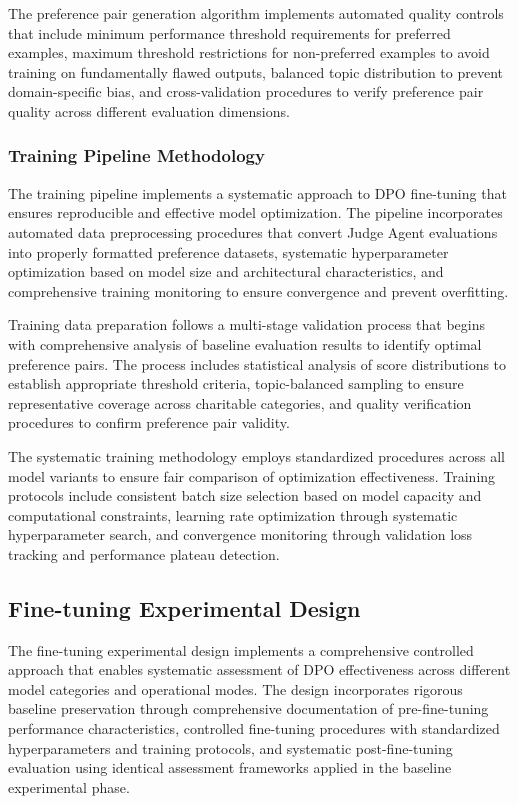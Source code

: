 The preference pair generation algorithm implements automated quality controls that include minimum performance threshold requirements for preferred examples, maximum threshold restrictions for non-preferred examples to avoid training on fundamentally flawed outputs, balanced topic distribution to prevent domain-specific bias, and cross-validation procedures to verify preference pair quality across different evaluation dimensions.

\subsubsection{Training Pipeline Methodology}

The training pipeline implements a systematic approach to DPO fine-tuning that ensures reproducible and effective model optimization. The pipeline incorporates automated data preprocessing procedures that convert Judge Agent evaluations into properly formatted preference datasets, systematic hyperparameter optimization based on model size and architectural characteristics, and comprehensive training monitoring to ensure convergence and prevent overfitting.

Training data preparation follows a multi-stage validation process that begins with comprehensive analysis of baseline evaluation results to identify optimal preference pairs. The process includes statistical analysis of score distributions to establish appropriate threshold criteria, topic-balanced sampling to ensure representative coverage across charitable categories, and quality verification procedures to confirm preference pair validity.

The systematic training methodology employs standardized procedures across all model variants to ensure fair comparison of optimization effectiveness. Training protocols include consistent batch size selection based on model capacity and computational constraints, learning rate optimization through systematic hyperparameter search, and convergence monitoring through validation loss tracking and performance plateau detection.

\subsection{Fine-tuning Experimental Design}

The fine-tuning experimental design implements a comprehensive controlled approach that enables systematic assessment of DPO effectiveness across different model categories and operational modes. The design incorporates rigorous baseline preservation through comprehensive documentation of pre-fine-tuning performance characteristics, controlled fine-tuning procedures with standardized hyperparameters and training protocols, and systematic post-fine-tuning evaluation using identical assessment frameworks applied in the baseline experimental phase.

